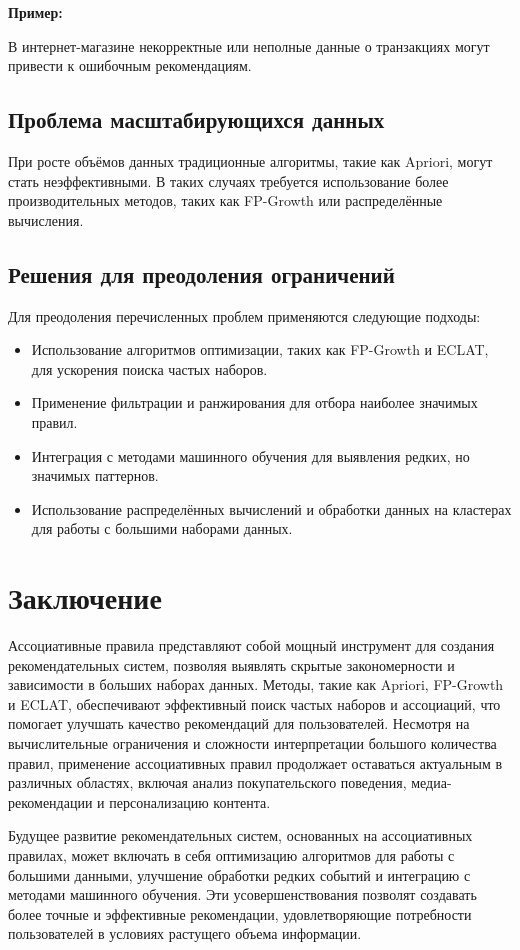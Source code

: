 \textbf{Пример:}

В интернет-магазине некорректные или неполные данные о транзакциях могут привести к ошибочным рекомендациям.

\subsection{Проблема масштабирующихся данных}

При росте объёмов данных традиционные алгоритмы, такие как Apriori, могут стать неэффективными. В таких случаях требуется использование более производительных методов, таких как FP-Growth или распределённые вычисления.

\subsection{Решения для преодоления ограничений}

Для преодоления перечисленных проблем применяются следующие подходы:

\begin{itemize}
    \item Использование алгоритмов оптимизации, таких как FP-Growth и ECLAT, для ускорения поиска частых наборов.
    \item Применение фильтрации и ранжирования для отбора наиболее значимых правил.
    \item Интеграция с методами машинного обучения для выявления редких, но значимых паттернов.
    \item Использование распределённых вычислений и обработки данных на кластерах для работы с большими наборами данных.
\end{itemize}

\section{Заключение}
Ассоциативные правила представляют собой мощный инструмент для создания рекомендательных систем, позволяя выявлять скрытые закономерности и зависимости в больших наборах данных. Методы, такие как Apriori, FP-Growth и ECLAT, обеспечивают эффективный поиск частых наборов и ассоциаций, что помогает улучшать качество рекомендаций для пользователей. Несмотря на вычислительные ограничения и сложности интерпретации большого количества правил, применение ассоциативных правил продолжает оставаться актуальным в различных областях, включая анализ покупательского поведения, медиа-рекомендации и персонализацию контента.

Будущее развитие рекомендательных систем, основанных на ассоциативных правилах, может включать в себя оптимизацию алгоритмов для работы с большими данными, улучшение обработки редких событий и интеграцию с методами машинного обучения. Эти усовершенствования позволят создавать более точные и эффективные рекомендации, удовлетворяющие потребности пользователей в условиях растущего объема информации.
